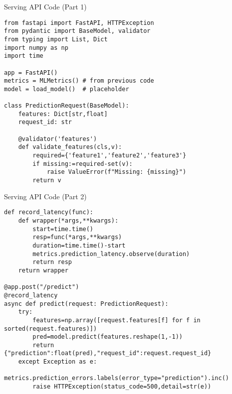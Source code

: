 \documentclass[aspectratio=169]{beamer}
\begin{document}


\begin{frame}[fragile]{Serving API Code (Part 1)}
\begin{verbatim}
from fastapi import FastAPI, HTTPException
from pydantic import BaseModel, validator
from typing import List, Dict
import numpy as np
import time

app = FastAPI()
metrics = MLMetrics() # from previous code
model = load_model()  # placeholder

class PredictionRequest(BaseModel):
    features: Dict[str,float]
    request_id: str

    @validator('features')
    def validate_features(cls,v):
        required={'feature1','feature2','feature3'}
        if missing:=required-set(v):
            raise ValueError(f"Missing: {missing}")
        return v
\end{verbatim}
\end{frame}



\begin{frame}[fragile]{Serving API Code (Part 2)}
\begin{verbatim}
def record_latency(func):
    def wrapper(*args,**kwargs):
        start=time.time()
        resp=func(*args,**kwargs)
        duration=time.time()-start
        metrics.prediction_latency.observe(duration)
        return resp
    return wrapper

@app.post("/predict")
@record_latency
async def predict(request: PredictionRequest):
    try:
        features=np.array([request.features[f] for f in sorted(request.features)])
        pred=model.predict(features.reshape(1,-1))
        return {"prediction":float(pred),"request_id":request.request_id}
    except Exception as e:
        metrics.prediction_errors.labels(error_type="prediction").inc()
        raise HTTPException(status_code=500,detail=str(e))
\end{verbatim}
\end{frame}
\end{document}
